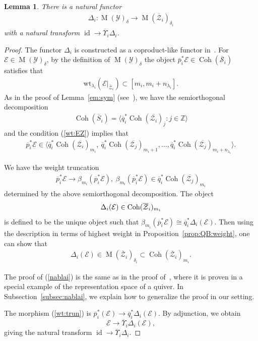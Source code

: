 \documentclass [11pt,oneside,a4paper,mathscr]{amsart}
\newtheorem{lemma}[thm]{Lemma}
\theoremstyle{definition}
\newcommand{\E}{\mathcal{E}}
\newcommand{\Y}{\mathcal{Y}}
\newcommand{\sS}{\mathcal{S}}
\newcommand{\zZ}{\mathcal{Z}}
\newcommand{\MM}{\operatorname{M}}
\newcommand{\Coh}{\operatorname{Coh}}
\newcommand{\id}{\operatorname{id}}
\newcommand{\ol}{\overline}
\newcommand{\wt}{\mathrm{wt}}
\begin{document}
\begin{lemma}\label{lem:delta}
There is a natural functor 
\begin{align*}
\Delta_i \colon \MM(\mathcal{Y})_{\delta} \to \MM(\overline{\mathcal{Z}}_i)_{\delta_i}
\end{align*}
with a natural transform $\id \to \ol{\Upsilon}_i \Delta_i$.
\end{lemma}
\begin{proof}
The functor $\Delta_i$ is constructed as a coproduct-like functor in~\cite[Lemma~5.1]{PT1}. 
For $\E \in \MM(\Y)_{\delta}$, 
by the definition of $\MM(\Y)_{\delta}$ 
the object $\ol{p}_i^{\ast}\E \in \Coh(\ol{\sS}_i)$
satisfies that
\begin{align}\label{wt:EZ}
\wt_{\lambda_i}(\mathcal{E}|_{\ol{\zZ}_i}) \subset [m_i, m_i+n_{\lambda_i}]. 
\end{align}
As in the proof of Lemma~\ref{em:sym} (see~\cite[Proposition~1.1.2, Lemma~1.5.6]{HalpK32}),
we have the semiorthogonal decomposition 
\begin{align*}
    \Coh(\overline{S}_i)=\langle \overline{q}_i^{\ast}\Coh(\overline{\mathcal{Z}_i})_j :
    j\in \mathbb{Z}\rangle
\end{align*}
and the condition (\ref{wt:EZ}) implies that
\begin{align*}
\overline{p}_i^{\ast}\mathcal{E}\in 
\langle \overline{q}_{i}^{\ast}\Coh(\overline{\mathcal{Z}_i})_{m_i}, \ 
\overline{q}_{i}^{\ast}\Coh(\overline{\mathcal{Z}_j})_{m_i+1}, \ldots, 
\overline{q}_{i}^{\ast}\Coh(\overline{\mathcal{Z}_j})_{m_i+n_{\lambda_i}}
\rangle.
\end{align*}

We have the weight truncation 
\begin{align}\label{wt:trun}
\ol{p}_i^{\ast} \mathcal{E} \to \beta_{m_i}(\ol{p}_i^{\ast}\E), \ 
\beta_{m_i}(\ol{p}_i^{\ast}\E)\in \overline{q}_{i}^{\ast}\Coh(\overline{\mathcal{Z}_j})_{m_i}
\end{align}
determined by the above semiorthogonal decomposition. 
The object \begin{align}\notag\Delta_i(\mathcal{E}) \in \Coh(\ol{\zZ}_i)_{m_i}\end{align} is defined to be the unique 
object such that 
$\beta_{m_i}(\ol{p}_i^{\ast}\E) \cong \ol{q}_i^{\ast}\Delta_i(\mathcal{E})$. 
Then using the description in terms of highest weight in Proposition~\ref{prop:QB:weight}, 
one can show that 
\begin{align}\label{nablai}
\Delta_i(\mathcal{E}) \in \MM(\ol{\zZ}_i)_{\delta_i} \subset \Coh(\ol{\zZ}_i)_{m_i}.
\end{align}

The proof of (\ref{nablai}) 
is the same as in the proof of~\cite[Lemma~5.1]{PT1}, 
where it is proven in a special example of the representation space of a quiver. 
In Subsection~\ref{subsec:nablai}, we explain how to generalize the proof in our setting. 

The morphism (\ref{wt:trun}) is $\overline{p}_i^{\ast}(\E) \to \ol{q}_i^{\ast}\Delta_i(\E)$. 
By adjunction, we obtain \[\E \to \ol{\Upsilon}_i\Delta_i(\E),\] giving 
the natural transform $\id \to \ol{\Upsilon}_i \Delta_i$. 
\end{proof}
\end{document}
